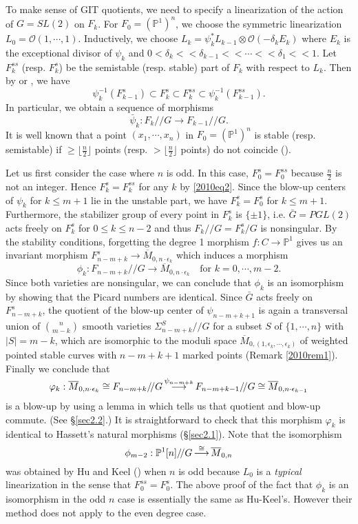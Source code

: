 \documentclass[10pt]{amsart}
\theoremstyle{definition}
\newcommand{\PP}{\mathbb{P}}
\newcommand{\cO}{\mathcal{O} }
\def\mapright#1{\,\smash{\mathop{\longrightarrow}\limits^{#1}}\,}
\def\Mzn{\overline{M}_{0,n} }
\def\Mzek{\overline{M}_{0,n\cdot \epsilon_k} }
\def\Mzeko{\overline{M}_{0,n\cdot \epsilon_{k-1}} }
\def\git{/\!/ }
\begin{document}
To make sense of GIT quotients, we need to specify a linearization
of the action of $G=SL(2)$ on $F_k$. For $F_0=(\PP^1)^n$, we
choose the symmetric linearization $L_0=\cO(1,\cdots, 1)$.
Inductively, we choose $L_k=\psi^*_kL_{k-1}\otimes
\cO(-\delta_kE_{k})$ where $E_k$ is the exceptional divisor of
$\psi_k$ and $0<\delta_k<\!<\delta_{k-1}<\!< \cdots
<\!<\delta_1<\!<1$. Let $F_k^{ss}$ (resp. $F_k^s$) be the
semistable (resp. stable) part of $F_k$ with respect to $L_k$.
Then by \cite[\S3]{Kirwan} or \cite[Theorem 3.11]{Hu}, we have
\begin{equation}\label{2010eq2}
\psi_k^{-1}(F^s_{k-1})\subset F_k^s\subset F_k^{ss}\subset
\psi_k^{-1}(F_{k-1}^{ss}).
\end{equation}
In particular, we obtain a sequence of morphisms
$$\bar\psi_k:F_k\git G\to F_{k-1}\git G.$$ It is well known that a
point $(x_1,\cdots,x_n)$ in $F_0=(\PP^1)^n$ is stable (resp.
semistable) if $\ge \lfloor \frac{n}2\rfloor$ points (resp. $>
\lfloor \frac{n}2\rfloor$ points) do not coincide (\cite{MFK,K1}).

Let us first consider the case where $n$ is odd. In this case,
$F_0^s=F_0^{ss}$ because $\frac{n}2$ is not an integer. Hence
$F_k^s=F_k^{ss}$ for any $k$ by \eqref{2010eq2}. Since the blow-up
centers of $\psi_k$ for $k\le m+1$ lie in the unstable part, we
have $F_k^s=F_0^s$ for $k\le m+1$. Furthermore, the stabilizer
group of every point in $F_k^s$ is $\{\pm 1\}$, i.e. $\bar
G=PGL(2)$ acts freely on $F_k^s$ for $0\le k\le n-2$ and thus
$F_k\git G=F_k^s/G$ is nonsingular. By the stability conditions,
forgetting the degree 1 morphism $f:C\to \PP^1$ gives us an
invariant morphism $F_{n-m+k}^s\to \Mzek$ which induces a morphism
$$\phi_k:F_{n-m+k}\git G\to \Mzek \quad \text{for } k=0,\cdots, m-2.$$
Since both varieties are nonsingular, we can conclude that
$\phi_k$ is an isomorphism by showing that the Picard numbers are
identical. Since $\bar G$ acts freely on $F_{n-m+k}^s$, the
quotient of the blow-up center of $\psi_{n-m+k+1}$ is again a
transversal union of $\binom{n}{m-k}$ smooth varieties
$\Sigma^S_{n-m+k}\git G$ for a subset $S$ of $\{1,\cdots, n\}$
with $|S|=m-k$, which are isomorphic to the moduli space
$\overline{M}_{0,(1,\epsilon_k,\cdots,\epsilon_k)}$ of weighted
pointed stable curves with $n-m+k+1$ marked points (Remark
\ref{2010rem1}). Finally we conclude that
$$\varphi_k:\Mzek\cong F_{n-m+k}\git G\mapright{\bar\psi_{n-m+k}}
F_{n-m+k-1}\git G\cong \Mzeko$$ is a blow-up by using a lemma in
\cite{Kirwan} which tells us that quotient and blow-up commute.
(See \S\ref{sec2.2}.) It is straightforward to check that this
morphism $\varphi_k$ is identical to Hassett's natural morphisms
(\S\ref{sec2.1}). Note that the isomorphism
$$\phi_{m-2}:\PP^1[n]\git G\mapright{\cong} \Mzn$$ was obtained
by Hu and Keel (\cite{HuKeel}) when $n$ is odd because $L_0$ is a
\emph{typical} linearization in the sense that $F_0^{ss}=F_0^s$.
The above proof of the fact that $\phi_k$ is an isomorphism in the
odd $n$ case is essentially the same as Hu-Keel's. However their
method does not apply to the even degree case.
\end{document}
